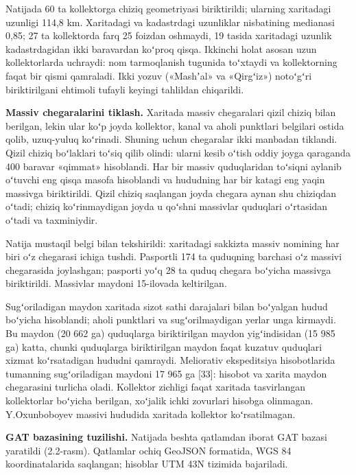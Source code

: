 Natijada 60 ta kollektorga chiziq geometriyasi biriktirildi; ularning
xaritadagi uzunligi 114,8 km. Xaritadagi va kadastrdagi uzunliklar
nisbatining medianasi 0,85; 27 ta kollektorda farq 25 foizdan oshmaydi,
19 tasida xaritadagi uzunlik kadastrdagidan ikki baravardan koʻproq
qisqa. Ikkinchi holat asosan uzun kollektorlarda uchraydi: nom
tarmoqlanish tugunida toʻxtaydi va kollektorning faqat bir qismi
qamraladi. Ikki yozuv («Mashʼal» va «Qirgʻiz») notoʻgʻri biriktirilgani
ehtimoli tufayli keyingi tahlildan chiqarildi.

\textbf{Massiv chegaralarini tiklash.} Xaritada massiv chegaralari qizil
chiziq bilan berilgan, lekin ular koʻp joyda kollektor, kanal va aholi
punktlari belgilari ostida qolib, uzuq-yuluq koʻrinadi. Shuning uchun
chegaralar ikki manbadan tiklandi. Qizil chiziq boʻlaklari toʻsiq qilib
olindi: ularni kesib oʻtish oddiy joyga qaraganda 400 baravar «qimmat»
hisoblandi. Har bir massiv quduqlaridan toʻsiqni aylanib oʻtuvchi eng
qisqa masofa hisoblandi va hududning har bir katagi eng yaqin massivga
biriktirildi. Qizil chiziq saqlangan joyda chegara aynan shu chiziqdan
oʻtadi; chiziq koʻrinmaydigan joyda u qoʻshni massivlar quduqlari
oʻrtasidan oʻtadi va taxminiydir.

Natija mustaqil belgi bilan tekshirildi: xaritadagi sakkizta massiv
nomining har biri oʻz chegarasi ichiga tushdi. Pasportli 174 ta
quduqning barchasi oʻz massivi chegarasida joylashgan; pasporti yoʻq 28
ta quduq chegara boʻyicha massivga biriktirildi. Massivlar maydoni
15-ilovada keltirilgan.

Sugʻoriladigan maydon xaritada sizot sathi darajalari bilan boʻyalgan
hudud boʻyicha hisoblandi; aholi punktlari va sugʻorilmaydigan yerlar
unga kirmaydi. Bu maydon (20 662 ga) quduqlarga biriktirilgan maydon
yigʻindisidan (15 985 ga) katta, chunki quduqlarga biriktirilgan maydon
faqat kuzatuv quduqlari xizmat koʻrsatadigan hududni qamraydi.
Meliorativ ekspeditsiya hisobotlarida tumanning sugʻoriladigan maydoni
17 965 ga {[}33{]}: hisobot va xarita maydon chegarasini turlicha oladi.
Kollektor zichligi faqat xaritada tasvirlangan kollektorlar boʻyicha
berilgan, xoʻjalik ichki zovurlari hisobga olinmagan. Y.Oxunboboyev
massivi hududida xaritada kollektor koʻrsatilmagan.

\textbf{GAT bazasining tuzilishi.} Natijada beshta qatlamdan iborat GAT
bazasi yaratildi (2.2-rasm). Qatlamlar ochiq GeoJSON formatida, WGS 84
koordinatalarida saqlangan; hisoblar UTM 43N tizimida bajariladi.

